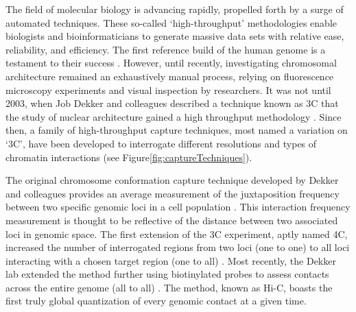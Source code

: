 The field of molecular biology is advancing rapidly, propelled forth by a surge of automated techniques.  These so-called `\gls{high-throughput}'
methodologies enable biologists and bioinformaticians to generate massive data sets with relative ease, reliability, and efficiency.  The first
reference build of the human genome is a testament to their success \citep{hgsc2004}.  However, until recently, investigating chromosomal architecture
remained an exhaustively manual process, relying on fluorescence microscopy experiments and visual inspection by researchers.  It was not until 2003,
when Job Dekker and colleagues described a technique known as \gls{3C} that the study of nuclear architecture gained a high throughput methodology
 \citep{dekker2002}. Since then, a family of high-throughput capture techniques, most named a variation on `\gls{3C}', have been developed to interrogate
different resolutions and types of chromatin interactions (see Figure\ref{fig:captureTechniques}).

The original chromosome conformation capture technique developed by Dekker and colleagues provides an average measurement of the juxtaposition frequency
between two specific genomic loci in a cell population \citep{frase2014}.  This interaction frequency measurement is thought to be reflective of
the distance between two associated loci in genomic space.  The first extension of the \gls{3C} experiment, aptly named \gls{4C}, increased
the number of interrogated regions from two loci (one to one) to all loci interacting with a chosen target region (one to all) \citep{simonis2006}.  Most
recently, the Dekker lab extended the method further using biotinylated probes to assess contacts across the entire genome (all to all) \citep{berkum2010}.
The method, known as Hi-C, boasts the first truly global quantization of every genomic contact at a given time.

